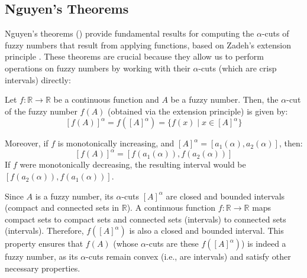 







\subsection{Nguyen's Theorems}
Nguyen's theorems (\cite[Thm. 1.3.1, 1.3.2]{FULLER2}) provide fundamental results for computing the $\alpha$-cuts of fuzzy numbers that result from applying functions, based on Zadeh's extension principle \cite{NGUYEN1978}. These theorems are crucial because they allow us to perform operations on fuzzy numbers by working with their $\alpha$-cuts (which are crisp intervals) directly:

\begin{theorem}
    Let $f: \mathbb{R} \to \mathbb{R}$ be a continuous function and $A$ be a fuzzy number. Then, the $\alpha$-cut of the fuzzy number $f(A)$ (obtained via the extension principle) is given by:
    \[
    [f(A)]^{\alpha} = f([A]^{\alpha}) = \{f(x) \mid x \in [A]^\alpha\}
    \]

    Moreover, if $f$ is monotonically increasing, and $[A]^\alpha = [a_1(\alpha), a_2(\alpha)]$, then:
    \[
    [f(A)]^{\alpha} = [f(a_1(\alpha)), f(a_2(\alpha))]
    \]
    If $f$ were monotonically decreasing, the resulting interval would be $[f(a_2(\alpha)), f(a_1(\alpha))]$.
\end{theorem}

\begin{remark}
Since $A$ is a fuzzy number, its $\alpha$-cuts $[A]^\alpha$ are closed and bounded intervals (compact and connected sets in $\mathbb{R}$). A continuous function $f: \mathbb{R} \to \mathbb{R}$ maps compact sets to compact sets and connected sets (intervals) to connected sets (intervals). Therefore, $f([A]^\alpha)$ is also a closed and bounded interval. This property ensures that $f(A)$ (whose $\alpha$-cuts are these $f([A]^\alpha)$) is indeed a fuzzy number, as its $\alpha$-cuts remain convex (i.e., are intervals) and satisfy other necessary properties. 
\end{remark}

